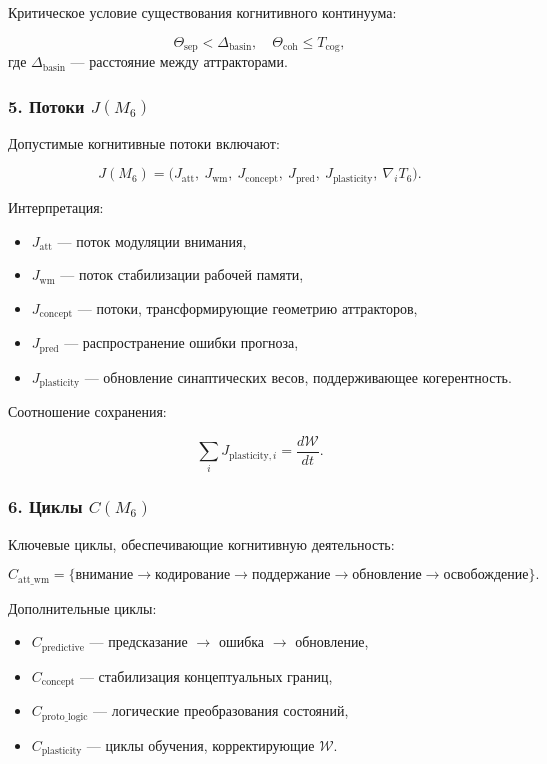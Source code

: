 Критическое условие существования когнитивного континуума:

\[
\Theta_{\mathrm{sep}} < \Delta_{\mathrm{basin}},
\quad
\Theta_{\mathrm{coh}} \le T_{\mathrm{cog}},
\]
где $\Delta_{\mathrm{basin}}$ — расстояние между аттракторами.

\subsubsection*{5. Потоки \texorpdfstring{$J(M_6)$}{J(M_6)}}

Допустимые когнитивные потоки включают:

\[
J(M_6) =
\big(
J_{\mathrm{att}},\
J_{\mathrm{wm}},\
J_{\mathrm{concept}},\
J_{\mathrm{pred}},\
J_{\mathrm{plasticity}},\
\nabla_i T_6
\big).
\]

Интерпретация:

\begin{itemize}
    \item $J_{\mathrm{att}}$ — поток модуляции внимания,
    \item $J_{\mathrm{wm}}$ — поток стабилизации рабочей памяти,
    \item $J_{\mathrm{concept}}$ — потоки, трансформирующие геометрию аттракторов,
    \item $J_{\mathrm{pred}}$ — распространение ошибки прогноза,
    \item $J_{\mathrm{plasticity}}$ — обновление синаптических весов, поддерживающее когерентность.
\end{itemize}

Соотношение сохранения:

\[
\sum_i J_{\mathrm{plasticity},i} = \frac{d\mathcal{W}}{dt}.
\]

\subsubsection*{6. Циклы \texorpdfstring{$C(M_6)$}{C(M_6)}}

Ключевые циклы, обеспечивающие когнитивную деятельность:

\[
C_{\mathrm{att\_wm}}
=
\{\text{внимание} \to \text{кодирование} \to
\text{поддержание} \to \text{обновление} \to \text{освобождение}\}.
\]

Дополнительные циклы:

\begin{itemize}
    \item $C_{\mathrm{predictive}}$ — предсказание $\to$ ошибка $\to$ обновление,
    \item $C_{\mathrm{concept}}$ — стабилизация концептуальных границ,
    \item $C_{\mathrm{proto\_logic}}$ — логические преобразования состояний,
    \item $C_{\mathrm{plasticity}}$ — циклы обучения, корректирующие $\mathcal{W}$.
\end{itemize}


